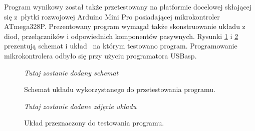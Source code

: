 Program wynikowy został także przetestowany na platformie docelowej skłającej się z~płytki rozwojowej Arduino Mini Pro posiadającej mikrokontroler ATmega328P. Prezentowany program wymagał także skonstruowanie układu z diod, przełączników i odpowiednich komponentów pasywnych. Rysunki \ref{fig:schematic} i \ref{fig:electronics} prezentują schemat i układ \comma\ na którym testowano program. Programowanie mikrokontrolera odbyło się przy użyciu programatora USBasp.

\begin{figure}
	\textit{Tutaj zostanie dodany schemat }
	\caption{Schemat układu wykorzystanego do przetestowania programu.}
	\label{fig:schematic}
\end{figure}

\begin{figure}
	\textit{Tutaj zostanie dodane zdjęcie układu  }
	\caption{Układ przeznaczony do testowania programu.}
	\label{fig:electronics}
\end{figure}


